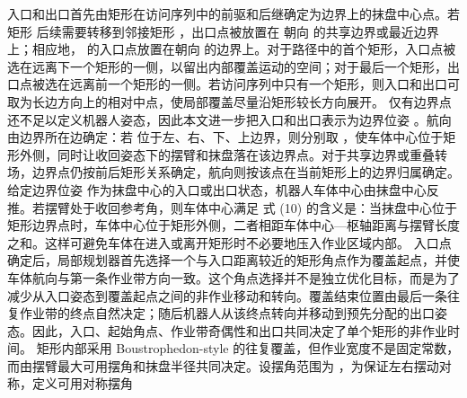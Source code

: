 \markdownRendererParagraphSeparator
{}入口和出口首先由矩形在访问序列中的前驱和后继确定为边界上的抹盘中心点。若矩形  后续需要转移到邻接矩形 ，出口点被放置在  朝向  的共享边界或最近边界上；相应地， 的入口点放置在朝向  的边界上。对于路径中的首个矩形，入口点被选在远离下一个矩形的一侧，以留出内部覆盖运动的空间；对于最后一个矩形，出口点被选在远离前一个矩形的一侧。若访问序列中只有一个矩形，则入口和出口可取为长边方向上的相对中点，使局部覆盖尽量沿矩形较长方向展开。\markdownRendererParagraphSeparator
{}仅有边界点还不足以定义机器人姿态，因此本文进一步把入口和出口表示为边界位姿 。航向 \markdownRendererInlineMath{\theta} 由边界所在边确定：若  位于左、右、下、上边界，则分别取 ，使车体中心位于矩形外侧，同时让收回姿态下的摆臂和抹盘落在该边界点。对于共享边界或重叠转场，边界点仍按前后矩形关系确定，航向则按该点在当前矩形上的边界归属确定。\markdownRendererParagraphSeparator
{}给定边界位姿  作为抹盘中心的入口或出口状态，机器人车体中心由抹盘中心反推。若摆臂处于收回参考角，则车体中心满足\markdownRendererParagraphSeparator
{}\markdownRendererParagraphSeparator
{}式 (10) 的含义是：当抹盘中心位于矩形边界点时，车体中心位于矩形外侧，二者相距车体中心—枢轴距离与摆臂长度之和。这样可避免车体在进入或离开矩形时不必要地压入作业区域内部。\markdownRendererParagraphSeparator
{}
\markdownRendererSectionEnd \markdownRendererSectionBegin
{}\markdownRendererParagraphSeparator
{}入口点确定后，局部规划器首先选择一个与入口距离较近的矩形角点作为覆盖起点，并使车体航向与第一条作业带方向一致。这个角点选择并不是独立优化目标，而是为了减少从入口姿态到覆盖起点之间的非作业移动和转向。覆盖结束位置由最后一条往复作业带的终点自然决定；随后机器人从该终点转向并移动到预先分配的出口姿态。因此，入口、起始角点、作业带奇偶性和出口共同决定了单个矩形的非作业时间。\markdownRendererParagraphSeparator
{}矩形内部采用 Boustrophedon-style 的往复覆盖，但作业宽度不是固定常数，而由摆臂最大可用摆角和抹盘半径共同决定。设摆角范围为 \markdownRendererInlineMath{[\phi_{\min},\phi_{\max}]}，为保证左右摆动对称，定义可用对称摆角\markdownRendererParagraphSeparator
